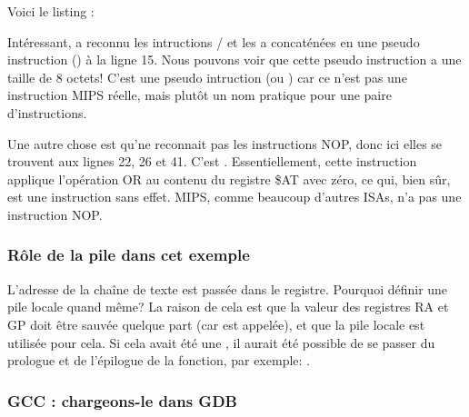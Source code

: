 Voici le listing \IDA:




Intéressant, \IDA a reconnu les intructions / et les a concaténées
en une pseudo instruction  () à la ligne 15.
Nous pouvons voir que cette pseudo instruction a une taille de 8 octets!
C'est une pseudo intruction (ou ) car ce n'est pas une instruction MIPS
réelle, mais plutôt un nom pratique pour une paire d'instructions.


Une autre chose est qu'\IDA ne reconnait pas les instructions \ac{NOP}, donc ici
elles se trouvent aux lignes 22, 26 et 41.
C'est .
Essentiellement, cette instruction applique l'opération OR au contenu du registre
\$AT avec zéro, ce qui, bien sûr, est une instruction sans effet.
MIPS, comme beaucoup d'autres \ac{ISA}s, n'a pas une instruction \ac{NOP}.

\subsubsection{Rôle de la pile dans cet exemple}

L'adresse de la chaîne de texte est passée dans le registre.
Pourquoi définir une pile locale quand même?
La raison de cela est que la valeur des registres \ac{RA} et GP doit être sauvée
quelque part (car \printf est appelée), et que la pile locale est utilisée pour cela.
Si cela avait été une , il aurait été
possible de se passer du prologue et de l'épilogue de la fonction, par
exemple: .

\subsubsection{GCC \Optimizing: chargeons-le dans GDB}




